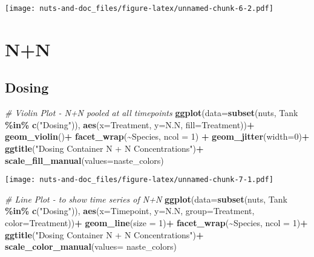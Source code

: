 \documentclass[
]{article}
\newenvironment{Shaded}{\begin{snugshade}}{\end{snugshade}}
\newcommand{\AttributeTok}[1]{\textcolor[rgb]{0.13,0.29,0.53}{#1}}
\newcommand{\CommentTok}[1]{\textcolor[rgb]{0.56,0.35,0.01}{\textit{#1}}}
\newcommand{\DecValTok}[1]{\textcolor[rgb]{0.00,0.00,0.81}{#1}}
\newcommand{\FunctionTok}[1]{\textcolor[rgb]{0.13,0.29,0.53}{\textbf{#1}}}
\newcommand{\NormalTok}[1]{#1}
\newcommand{\SpecialCharTok}[1]{\textcolor[rgb]{0.81,0.36,0.00}{\textbf{#1}}}
\newcommand{\StringTok}[1]{\textcolor[rgb]{0.31,0.60,0.02}{#1}}
\begin{document}
\texttt{[image: nuts-and-doc\_files/figure-latex/unnamed-chunk-6-2.pdf]}

\hypertarget{nn}{%
\section{N+N}\label{nn}}

\hypertarget{dosing-1}{%
\subsection{Dosing}\label{dosing-1}}

\begin{Shaded}
\begin{Highlighting}[]
\CommentTok{\# Violin Plot {-} N+N pooled at all timepoints}
\FunctionTok{ggplot}\NormalTok{(}\AttributeTok{data=}\FunctionTok{subset}\NormalTok{(nuts, Tank }\SpecialCharTok{\%in\%} \FunctionTok{c}\NormalTok{(}\StringTok{"Dosing"}\NormalTok{)), }\FunctionTok{aes}\NormalTok{(}\AttributeTok{x=}\NormalTok{Treatment, }\AttributeTok{y=}\NormalTok{N.N, }\AttributeTok{fill=}\NormalTok{Treatment))}\SpecialCharTok{+}
  \FunctionTok{geom\_violin}\NormalTok{()}\SpecialCharTok{+}
  \FunctionTok{facet\_wrap}\NormalTok{(}\SpecialCharTok{\textasciitilde{}}\NormalTok{Species, }\AttributeTok{ncol =} \DecValTok{1}\NormalTok{) }\SpecialCharTok{+}
  \FunctionTok{geom\_jitter}\NormalTok{(}\AttributeTok{width=}\DecValTok{0}\NormalTok{)}\SpecialCharTok{+}
  \FunctionTok{ggtitle}\NormalTok{(}\StringTok{"Dosing Container N + N Concentrations"}\NormalTok{)}\SpecialCharTok{+}
  \FunctionTok{scale\_fill\_manual}\NormalTok{(}\AttributeTok{values=}\NormalTok{naste\_colors)}
\end{Highlighting}
\end{Shaded}

\texttt{[image: nuts-and-doc\_files/figure-latex/unnamed-chunk-7-1.pdf]}

\begin{Shaded}
\begin{Highlighting}[]
\CommentTok{\# Line Plot {-} to show time series of N+N}
\FunctionTok{ggplot}\NormalTok{(}\AttributeTok{data=}\FunctionTok{subset}\NormalTok{(nuts, Tank }\SpecialCharTok{\%in\%} \FunctionTok{c}\NormalTok{(}\StringTok{"Dosing"}\NormalTok{)), }\FunctionTok{aes}\NormalTok{(}\AttributeTok{x=}\NormalTok{Timepoint, }\AttributeTok{y=}\NormalTok{N.N, }\AttributeTok{group=}\NormalTok{Treatment, }\AttributeTok{color=}\NormalTok{Treatment))}\SpecialCharTok{+}
  \FunctionTok{geom\_line}\NormalTok{(}\AttributeTok{size =} \DecValTok{1}\NormalTok{)}\SpecialCharTok{+}
  \FunctionTok{facet\_wrap}\NormalTok{(}\SpecialCharTok{\textasciitilde{}}\NormalTok{Species, }\AttributeTok{ncol =} \DecValTok{1}\NormalTok{)}\SpecialCharTok{+}
  \FunctionTok{ggtitle}\NormalTok{(}\StringTok{"Dosing Container N + N Concentrations"}\NormalTok{)}\SpecialCharTok{+}
  \FunctionTok{scale\_color\_manual}\NormalTok{(}\AttributeTok{values=}\NormalTok{ naste\_colors)}
\end{Highlighting}
\end{Shaded}
\end{document}
